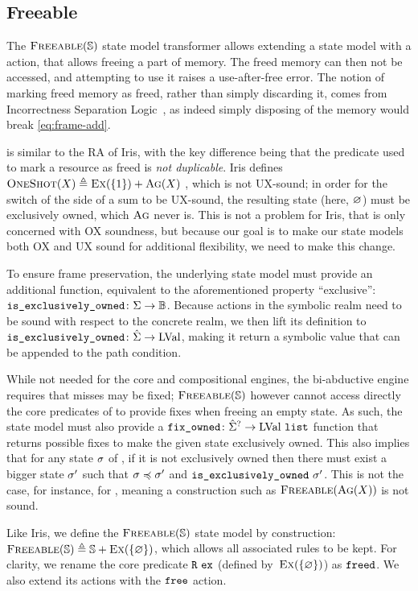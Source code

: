 \subsection{Freeable}

The $\textsc{Freeable}(\mathbb S)$ state model transformer allows extending a state model with a \free{} action, that allows freeing a part of memory. The freed memory can then not be accessed, and attempting to use it raises a use-after-free error. The notion of marking freed memory as freed, rather than simply discarding it, comes from Incorrectness Separation Logic~\cite{isl}, as indeed simply disposing of the memory would break \ref{eq:frame-add}.

\Freeable{} is similar to the  RA of Iris, with the key difference being that the \freedP{} predicate used to mark a resource as freed is \emph{not duplicable}. Iris defines $\textsc{OneShot}(X) \triangleq \textsc{Ex}(\{1\}) + \textsc{Ag}(X)$ \cite{iris}, which is not UX-sound; in order for the switch of the side of a sum to be UX-sound, the resulting state (here, $\varnothing$) must be exclusively owned, which $\textsc{Ag}$ never is. This is not a problem for Iris, that is only concerned with OX soundness, but because our goal is to make our state models both OX and UX sound for additional flexibility, we need to make this change.

To ensure frame preservation, the underlying state model must provide an additional function, equivalent to the aforementioned property ``exclusive'': ${\texttt{is\_exclusively\_owned}\colon\Sigma\rightarrow\mathbb{B}}$. Because actions in the symbolic realm need to be sound with respect to the concrete realm, we then lift its definition to ${\texttt{is\_exclusively\_owned}\colon\hat{\Sigma}\rightarrow\text{LVal}}$, making it return a symbolic value that can be appended to the path condition.

While not needed for the core and compositional engines, the bi-abductive engine requires that  misses may be fixed; $\textsc{Freeable}(\mathbb S)$ however cannot access directly the core predicates of \mmdl{} to provide fixes when freeing an empty state. As such, the state model must also provide a ${\texttt{fix\_owned}\colon\hat{\Sigma}^?\rightarrow\text{LVal}~\texttt{list}}$ function that returns possible fixes to make the given state exclusively owned. This also implies that for any state $\sigma$ of \mmdl{}, if it is not exclusively owned then there must exist a bigger state $\sigma'$ such that $\sigma\preccurlyeq\sigma'$ and $\texttt{is\_exclusively\_owned}~\sigma'$. This is not the case, for instance, for \Ag, meaning a construction such as $\textsc{Freeable}(\textsc{Ag}(X))$ is not sound.

Like Iris, we define the $\textsc{Freeable}(\mathbb S)$ state model by construction: ${\textsc{Freeable}(\mathbb S) \triangleq \mathbb S + \textsc{Ex}(\{\varnothing\})}$, which allows all associated rules to be kept. For clarity, we rename the core predicate $\texttt{R}~\texttt{ex}$ (defined by~$\textsc{Ex}(\{\varnothing\})$) as $\texttt{freed}$. We also extend its actions with the $\texttt{free}$ action.

